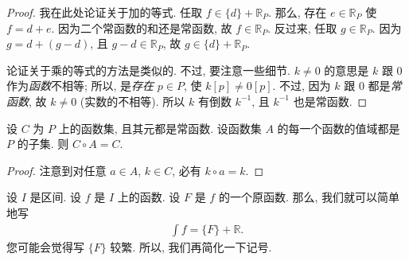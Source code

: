 \begin{proof}
    我在此处论证关于加的等式.
    任取 $f \in \{ d \} + \mathbb{R}_{P}$.
    那么, 存在 $e \in \mathbb{R}_{P}$ 使 $f = d + e$.
    因为二个常函数的和还是常函数, 故 $f \in \mathbb{R}_{P}$.
    反过来, 任取 $g \in \mathbb{R}_{P}$.
    因为 $g = d + (g - d)$, 且 $g - d \in \mathbb{R}_{P}$,
    故 $g \in \{ d \} + \mathbb{R}_{P}$.

    论证关于乘的等式的方法是类似的.
    不过, 要注意一些细节.
    $k \neq 0$ 的意思是 $k$ 跟 $0$ 作为\emph{函数}不相等;
    所以, 是\emph{存在} $p \in P$, 使 $k[p] \neq 0[p]$.
    不过, 因为 $k$ 跟 $0$ 都是\emph{常函数},
    故 $k \neq 0$ (实数的不相等).
    所以 $k$ 有倒数 $k^{-1}$, 且 $k^{-1}$ 也是常函数.
\end{proof}

\begin{theorem}
    设 $C$ 为 $P$ 上的函数集, 且其元都是常函数.
    设函数集 $A$ 的每一个函数的值域都是 $P$ 的子集.
    则 $C \circ A = C$.
\end{theorem}

\begin{proof}
    注意到对任意 $a \in A$, $k \in C$, 必有 $k \circ a = k$.
\end{proof}

设 $I$ 是区间.
设 $f$ 是 $I$ 上的函数.
设 $F$ 是 $f$ 的一个原函数.
那么, 我们就可以简单地写
\begin{align*}
    \int {f} = \{ F \} + \mathbb{R}.
\end{align*}
您可能会觉得写 $\{ F \}$ 较繁.
所以, 我们再简化一下记号.

